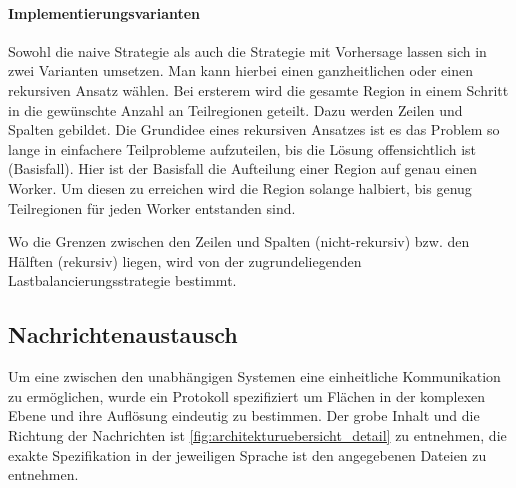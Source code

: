 \paragraph{Implementierungsvarianten}
Sowohl die naive Strategie als auch die Strategie mit Vorhersage lassen sich in zwei Varianten umsetzen.
Man kann hierbei einen ganzheitlichen oder einen rekursiven Ansatz wählen.
Bei ersterem wird die gesamte Region in einem Schritt in die gewünschte Anzahl an Teilregionen geteilt.
Dazu werden Zeilen und Spalten gebildet.
Die Grundidee eines rekursiven Ansatzes ist es das Problem so lange in einfachere Teilprobleme aufzuteilen, bis die Lösung offensichtlich ist (Basisfall).
Hier ist der Basisfall die Aufteilung einer Region auf genau einen Worker.
Um diesen zu erreichen wird die Region solange halbiert, bis genug Teilregionen für jeden Worker entstanden sind.

Wo die Grenzen zwischen den Zeilen und Spalten (nicht-rekursiv) bzw. den Hälften (rekursiv) liegen, wird von der zugrundeliegenden Lastbalancierungsstrategie bestimmt.

\subsection{Nachrichtenaustausch}
Um eine zwischen den unabhängigen Systemen eine einheitliche Kommunikation zu ermöglichen,
wurde ein Protokoll spezifiziert um Flächen in der komplexen Ebene und ihre Auflösung eindeutig zu bestimmen.
Der grobe Inhalt und die Richtung der Nachrichten ist \autoref{fig:architekturuebersicht_detail} zu entnehmen,
die exakte Spezifikation in der jeweiligen Sprache ist den angegebenen Dateien zu entnehmen.

